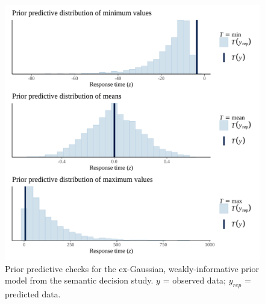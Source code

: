 \documentclass[
  12pt,
  man,floatsintext]{apa7}
\begin{document}
\begin{figure}

{\centering \includegraphics[width=0.8\linewidth]{../semanticdecision/bayesian_analysis/prior_predictive_checks/plots/semanticdecision_priorpredictivecheck_weaklyinformativepriors_exgaussian} 

}

\caption{Prior predictive checks for the ex-Gaussian, weakly-informative prior model from the semantic decision study. \(y\) = observed data; \(y_{rep}\) = predicted data.}\label{fig:semanticdecision-priorpredictivecheck-weaklyinformativepriors-exgaussian}
\end{figure}
\end{document}
